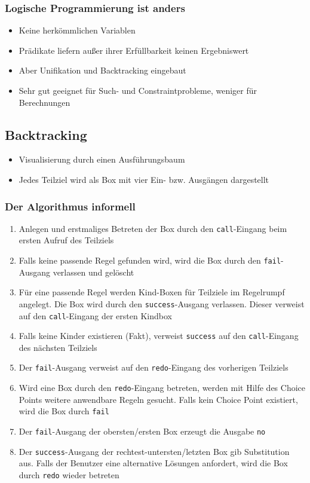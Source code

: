 \subsubsection{Logische Programmierung ist anders}
\begin{itemize}
	\item Keine herkömmlichen Variablen
	\item Prädikate liefern außer ihrer Erfüllbarkeit keinen Ergebniswert
	\item Aber Unifikation und Backtracking eingebaut
	\item Sehr gut geeignet für Such- und Constraintprobleme, weniger für Berechnungen
\end{itemize}


\subsection{Backtracking}
\begin{itemize}
	\item Visualisierung durch einen Ausführungsbaum
	\item Jedes Teilziel wird als Box mit vier Ein- bzw. Ausgängen dargestellt
\end{itemize}

\subsubsection{Der Algorithmus informell}
\begin{enumerate}
	\item Anlegen und erstmaliges Betreten der Box durch den \texttt{call}-Eingang beim ersten Aufruf des Teilziels
	\item Falls keine passende Regel gefunden wird, wird die Box durch den \texttt{fail}-Ausgang verlassen und gelöscht
	\item Für eine passende Regel werden Kind-Boxen für Teilziele im Regelrumpf angelegt. Die Box wird durch den \texttt{success}-Ausgang verlassen. Dieser verweist auf den \texttt{call}-Eingang der ersten Kindbox
	\item Falls keine Kinder existieren (Fakt), verweist \texttt{success} auf den \texttt{call}-Eingang des nächsten Teilziels
	\item Der \texttt{fail}-Ausgang verweist auf den \texttt{redo}-Eingang des vorherigen Teilziels
	\item Wird eine Box durch den \texttt{redo}-Eingang betreten, werden mit Hilfe des Choice Points weitere anwendbare Regeln gesucht. Falls kein Choice Point existiert, wird die Box durch \texttt{fail}
	\item Der \texttt{fail}-Ausgang der obersten/ersten Box erzeugt die Ausgabe \texttt{no}
	\item Der \texttt{success}-Ausgang der rechtest-untersten/letzten Box gib Substitution aus. Falls der Benutzer eine alternative Lösungen anfordert, wird die Box durch \texttt{redo} wieder betreten
\end{enumerate}


